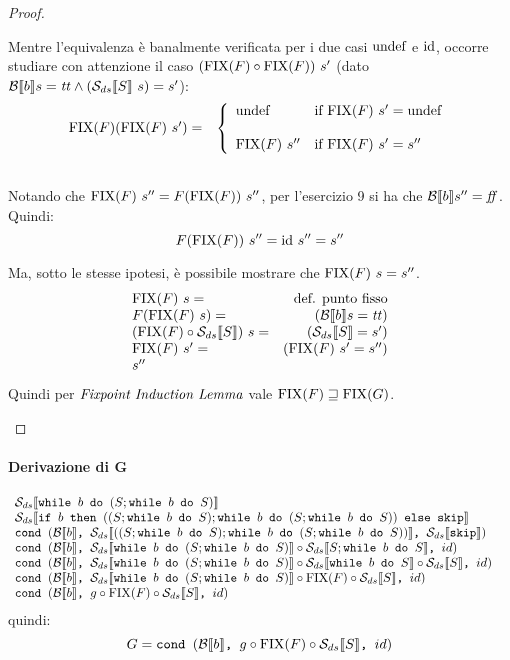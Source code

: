 {\begin{proof}
\begin{itemize}
        Mentre l'equivalenza è banalmente verificata per i due casi $\undefDS$
        e $\idDS$, occorre studiare con attenzione il caso
        $(\fixp{F} \circ \fixp{F})\ s'$ (dato
        $\B{b} = \semtrue \land (\dsCtxt{S}\ s) = s'$):
        $$
        \begin{array}{ll}
        \fixp{F} (\fixp{F}\ s') =
        & \caseFun{\undefDS}
                  {\fixp{F}\ s' = \undefDS}
                  {\fixp{F}\ s''}
                  {\fixp{F}\ s' = s''}  \\
        \\
        \end{array}
        $$

        Notando che $\fixp{F}\ s'' = F(\fixp{F})\ s''$, per l'esercizio 9 si
        ha che $\B{b}'' = \semfalse$. Quindi:
        $$
        F(\fixp{F})\ s'' = \idDS{}\ s'' = s''
        $$

        Ma, sotto le stesse ipotesi, è possibile mostrare che
        $\fixp{F}\ s  =s''$.
        $$
        \begin{array}{lr}
        \fixp{F}\ s = & \text{def. punto fisso} \\
        F(\fixp{F}\ s) = & (\B{b} = \semtrue) \\
        (\fixp{F} \circ \dsCtxt{S})\ s = & (\dsCtxt{S} = s') \\
        \fixp{F} \ s' = & (\fixp{F}\ s' = s'') \\
        s''
        \end{array}
        $$
        Quindi per $\FPIL$ vale $\fixp{F} \sqsupseteq \fixp{G}$.
\end{itemize}

\end{proof}
\paragraph{Derivazione di G}
$$
\begin{array}{ll}
\dsCtxt{\wbS{b}{(S; \wbS{b}{S})}} & \\
\dsCtxt{\ifABC{b}{((S; \wbS{b}{S}); \wbS{b}{(S; \wbS{b}{S})})}{\skipForFriends}} & \\
\cond{b}{\dsCtxt{((S; \wbS{b}{S}); \wbS{b}{(S; \wbS{b}{S})})}}{\dsCtxt{\skipForFriends}}\\
\cond{b}{\dsCtxt{\wbS{b}{(S; \wbS{b}{S})}} \circ \dsCtxt{S; \wbS{b}{S}}}{id} & \\
\cond{b}{\dsCtxt{\wbS{b}{(S; \wbS{b}{S})}} \circ \dsCtxt{\wbS{b}{S}} \circ \dsCtxt{S}}{id} & \\
\cond{b}{\dsCtxt{\wbS{b}{(S; \wbS{b}{S})}} \circ \fixp{F} \circ \dsCtxt{S}}{id} & \\
\cond{b}{g \circ \fixp{F} \circ \dsCtxt{S}}{id} & \\
\end{array}
$$
quindi:
$$
G = \cond{b}{g \circ \fixp{F} \circ \dsCtxt{S}}{id}
$$
}
